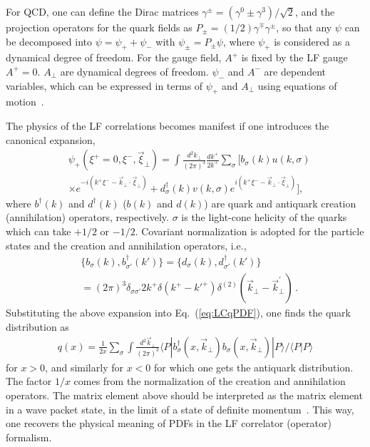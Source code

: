 \documentclass[aps,rmp,reprint,amsmath,amssymb,graphicx,longbibliography]{revtex4-1} %
\DeclareRobustCommand{\eq}[1]{Eq.~(\ref{eq:#1})}
\begin{document}
For QCD, one can define the Dirac matrices
$\gamma^\pm = (\gamma^0\pm\gamma^3)/\sqrt{2}$, and the
projection operators for the quark fields
as $P_\pm = (1/2)\gamma^\mp\gamma^\pm$, so that any $\psi$
can be decomposed into $\psi=\psi_++\psi_-$ with
$\psi_\pm = P_\pm \psi$, where $\psi_+$ is considered as a dynamical degree of freedom.
For the gauge field, $A^+$ is fixed by the LF gauge
$A^+=0$. $A_\perp$ are dynamical degrees of freedom. $\psi_-$ and $A^-$ are dependent variables, which can be expressed in
terms of $\psi_+$ and $A_\perp$ using equations of motion~\cite{Kogut:1969xa}.

The physics of the LF correlations becomes manifest
if one introduces the canonical expansion,
\begin{align}
	& \psi_+(\xi^+=0,\xi^-,\vec{\xi}_\perp)
	= \int \frac{d^2k_\perp}{ (2\pi)^3}
	\frac{dk^+}{ 2k^+}\sum_\sigma \Big[ b_\sigma(k) u({k,\sigma})
	\nonumber \\
	&  \times e^{-i(k^+\xi^--\vec{k}_\perp\cdot\vec{\xi}_\perp)}
	+ d_\sigma^\dagger(k) v({k,\sigma})e^{i(k^+\xi^--\vec{k}_\perp\cdot\vec{\xi}_\perp)}
	\Big],
\end{align}
where $b^\dagger(k)$ and $d^\dagger(k)$ ($b(k)$ and $d(k)$) are quark and antiquark creation (annihilation)
operators, respectively. {$\sigma$ is the light-cone
	helicity of the quarks which can take $+1/2$ or $-1/2$.} Covariant normalization is adopted for the particle
states and the creation and annihilation operators, i.e.,
\begin{align}
	& \big\{b_\sigma(k),b_{\sigma'}^\dagger(k')\big\}=
	\big\{d_\sigma(k),d_{\sigma'}^\dagger(k')\big\} \nonumber \\
	& =(2\pi)^3\delta_{\sigma\sigma'}2k^+\delta(k^+-k'^{+})
	\delta^{(2)}(\vec{k}_\perp-\vec{k}_\perp^\prime)\,.
\end{align}
Substituting the above expansion into \eq{LCqPDF}, one finds the quark distribution as
\begin{align}
	q(x) = \frac{1}{2x} \sum_\sigma \int \frac{d^2{\vec k}_\perp}{(2\pi)^3}
	\langle P|b_\sigma^\dagger(x,\vec{k}_\perp)b_\sigma(x,\vec{k}_\perp)|P\rangle/\langle P|P\rangle
	\label{eq:partonfock}
\end{align}
for $x>0$, and similarly for $x<0$ for which one gets the antiquark distribution.
The factor $1/x$ comes from the normalization of the creation and annihilation operators. The matrix element above should be interpreted as the matrix element in a wave packet state, in the limit of a state of definite momentum~\cite{Collins:2011zzd}.
This way, one recovers the physical meaning of PDFs in the LF correlator (operator) formalism.
\end{document}
